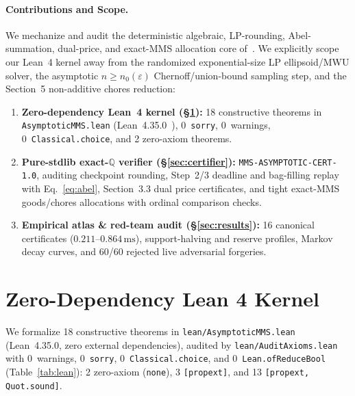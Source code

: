 \documentclass[11pt,twocolumn]{article}
\newcommand{\QQ}{\mathbb{Q}}
\begin{document}
\paragraph{Contributions and Scope.}
We mechanize and audit the deterministic algebraic, LP-rounding, Abel-summation, dual-price, and exact-MMS allocation core of~\cite{lin2026mms}. We explicitly scope our Lean~4 kernel away from the randomized exponential-size LP ellipsoid/MWU solver, the asymptotic $n \ge n_0(\varepsilon)$ Chernoff/union-bound sampling step, and the Section~5 non-additive chores reduction:
\begin{enumerate}[leftmargin=*,nosep]
  \item \textbf{Zero-dependency Lean~4 kernel (\S\ref{sec:lean}):} 18 constructive theorems in \texttt{AsymptoticMMS.lean} (Lean~4.35.0~\cite{demoura2021lean4}), 0~\texttt{sorry}, 0~warnings, 0~\texttt{Classical.choice}, and 2 zero-axiom theorems.
  \item \textbf{Pure-stdlib exact-\texorpdfstring{$\QQ$}{Q} verifier (\S\ref{sec:certifier}):} \texttt{MMS-ASYMPTOTIC-CERT-1.0}, auditing checkpoint rounding, Step~2/3 deadline and bag-filling replay with Eq.~\eqref{eq:abel}, Section~3.3 dual price certificates, and tight exact-MMS goods/chores allocations with ordinal comparison checks.
  \item \textbf{Empirical atlas \& red-team audit (\S\ref{sec:results}):} 16 canonical certificates ($0.211$--$0.864\,\mathrm{ms}$), support-halving and reserve profiles, Markov decay curves, and 60/60 rejected live adversarial forgeries.
\end{enumerate}

\section{Zero-Dependency Lean 4 Kernel}\label{sec:lean}
We formalize 18 constructive theorems in \texttt{lean/AsymptoticMMS.lean} (Lean~4.35.0, zero external dependencies), audited by \texttt{lean/AuditAxioms.lean} with 0~warnings, 0~\texttt{sorry}, 0~\texttt{Classical.choice}, and 0~\texttt{Lean.ofReduceBool} (Table~\ref{tab:lean}): 2 zero-axiom (\texttt{none}), 3 \texttt{[propext]}, and 13 \texttt{[propext, Quot.sound]}.
\end{document}
